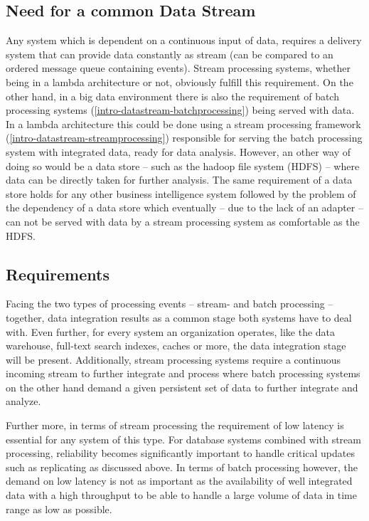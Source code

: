 \subsection{Need for a common Data Stream}
Any system which is dependent on a continuous input of data, requires a delivery
system that can provide data constantly as stream (can be
compared to an ordered message queue  containing events). Stream
processing systems, whether being in a lambda architecture or not, obviously
fulfill this requirement. On the other hand, in a big data environment there is
also the requirement of batch processing systems
(\ref{intro-datastream-batchprocessing}) being served with data. In a lambda
architecture this could be done using a stream processing framework
(\ref{intro-datastream-streamprocessing}) responsible for serving the batch
processing system with integrated data, ready for data analysis. However, an
other way of doing so would be a data store -- such as the hadoop file system
(HDFS) -- where data can be directly taken for further analysis.
The same requirement of a data store holds for any
other business intelligence system followed by the problem of the dependency of
a data store which eventually -- due to the lack of an adapter -- can not be
served with data by a stream processing system as comfortable as the HDFS.

\subsection{Requirements}
Facing the two types of processing events -- stream- and batch
processing -- together, data integration results as a common stage both systems
have to deal with. Even further, for every system an organization operates, like
the data warehouse, full-text search indexes, caches or more, the data
integration stage will be present. Additionally, stream processing systems
require a continuous incoming stream to further integrate and process where
batch processing systems on the other hand demand a given persistent set of data
to further integrate and analyze.

Further more, in terms of stream processing the requirement of low latency is
essential for any system of this type. For database systems combined with stream
processing, reliability becomes significantly important to handle critical
updates such as replicating as discussed above. In terms of batch processing
however, the demand on low latency is not as important as the availability of
well integrated data with a high throughput to be able to handle a large volume
of data in time range as low as possible.

